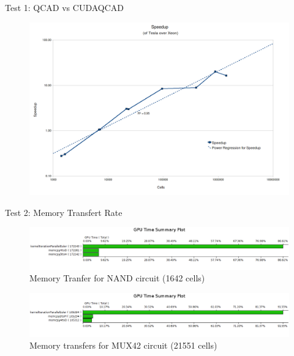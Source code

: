 \documentclass[10pt, red]{beamer}
\begin{document}
	\begin{frame}{Test 1: QCAD vs CUDAQCAD}
	 	\begin{figure}
			\centering
			\includegraphics[width=\textwidth]{img/speedup}
	 	\end{figure} 
	\end{frame}

	\begin{frame}{Test 2: Memory Transfert Rate}
	 	\begin{figure}
			\centering
			\includegraphics[width=\textwidth]{img/GPUTimeSummaryPlotNAND}
			\caption{Memory Tranfer for NAND circuit (1642 cells)}
	 	\end{figure} 
		\begin{figure}
			\centering
			\includegraphics[width=\textwidth]{img/GPUTimeSummaryPlotMUX42}
			\caption{Memory transfers for MUX42 circuit (21551 cells)}
		\end{figure}
	\end{frame}
\end{document}
